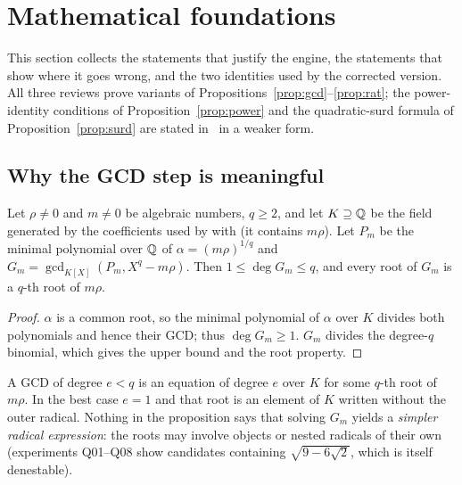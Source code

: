 \section{Mathematical foundations}
\label{sec:math}
This section collects the statements that justify the engine, the statements
that show where it goes wrong, and the two identities used by the corrected
version. All three reviews prove variants of
Propositions~\ref{prop:gcd}--\ref{prop:rat}; the power-identity conditions of
Proposition~\ref{prop:power} and the quadratic-surd formula of
Proposition~\ref{prop:surd} are stated in \RIII\ in a weaker form.

\subsection{Why the GCD step is meaningful}
\begin{proposition}\label{prop:gcd}
Let $\rho\ne0$ and $m\ne0$ be algebraic numbers, $q\ge2$, and let $K\supseteq\mathbb{Q}$
be the field generated by the coefficients used by  with
 (it contains $m\rho$). Let $P_m$ be the minimal
polynomial over $\mathbb{Q}$ of $\alpha=(m\rho)^{1/q}$ and $G_m=\gcd_{K[X]}(P_m,X^q-m\rho)$.
Then $1\le\deg G_m\le q$, and every root of $G_m$ is a $q$-th root of $m\rho$.
\end{proposition}
\begin{proof}
$\alpha$ is a common root, so the minimal polynomial of $\alpha$ over $K$ divides
both polynomials and hence their GCD; thus $\deg G_m\ge1$. $G_m$ divides the
degree-$q$ binomial, which gives the upper bound and the root property.
\end{proof}
A GCD of degree $e<q$ is an equation of degree $e$ over $K$ for some $q$-th
root of $m\rho$. In the best case $e=1$ and that root is an element of $K$
written without the outer radical. Nothing in the proposition says that
solving $G_m$ yields a \emph{simpler radical expression}: the roots may involve
 objects or nested radicals of their own (experiments Q01--Q08 show
candidates containing $\sqrt{9-6\sqrt2}$, which is itself denestable).

